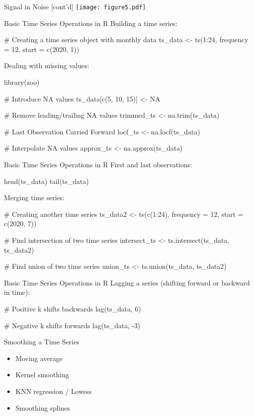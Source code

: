 \documentclass[ignorenonframetext,xcolor=x11names]{beamer}
\begin{document}
\begin{frame}{Signal in Noise \small [cont'd]}
\centering
\texttt{[image: figure5.pdf]}
\end{frame}

\begin{frame}[fragile]{Basic Time Series Operations in R}
Building a time series:
\begin{Rcode}
# Creating a time series object with monthly data
ts_data <- ts(1:24, frequency = 12, start = c(2020, 1))
\end{Rcode}
Dealing with missing values:
\begin{Rcode}
library(zoo)

# Introduce NA values
ts_data[c(5, 10, 15)] <- NA

# Remove leading/trailing NA values
trimmed_ts <- na.trim(ts_data)

# Last Observation Carried Forward
locf_ts <- na.locf(ts_data)

# Interpolate NA values
approx_ts <- na.approx(ts_data)
\end{Rcode}
\end{frame}

\begin{frame}[fragile]{Basic Time Series Operations in R}
First and last observations:
\begin{Rcode}
head(ts_data)
tail(ts_data)
\end{Rcode}
Merging time series:
\begin{Rcode}
# Creating another time series
ts_data2 <- ts(c(1:24), frequency = 12, start = c(2020, 7))

# Find intersection of two time series
intersect_ts <- ts.intersect(ts_data, ts_data2)

# Find union of two time series
union_ts <- ts.union(ts_data, ts_data2)
\end{Rcode}
\end{frame}

\begin{frame}[fragile]{Basic Time Series Operations in R}
Lagging a series (shifting forward or backward in time):
\begin{Rcode}
# Positive k shifts backwards
lag(ts_data, 6)

# Negative k shifts forwards
lag(ts_data, -3)
\end{Rcode}
\end{frame}

\begin{frame}{Smoothing a Time Series}
\begin{itemize}
   \item Moving average
   \item Kernel smoothing
   \item KNN regression / Lowess
   \item Smoothing splines
\end{itemize}
\end{frame}
\end{document}
